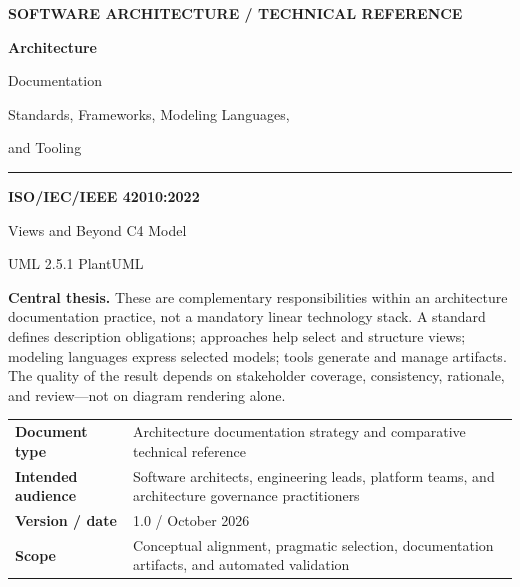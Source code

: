 \documentclass[11pt,letterpaper,oneside]{article}
\begin{document}
\thispagestyle{empty}
\vspace*{0.42in}
\vspace{0.32in}
{\small\bfseries\color{Teal}\MakeUppercase{Software Architecture / Technical Reference}}\par
\vspace{0.24in}
{\fontsize{31}{36}\selectfont\bfseries\color{Navy} Architecture\par Documentation}\par
\vspace{0.17in}
{\Large\color{Slate} Standards, Frameworks, Modeling Languages,\par and Tooling}\par
\vspace{0.34in}
\rule{\textwidth}{0.8pt}
\vspace{0.20in}
{\large\bfseries\color{Navy}ISO/IEC/IEEE 42010:2022\par
Views and Beyond \quad\textbullet\quad C4 Model\par
UML 2.5.1 \quad\textbullet\quad PlantUML}\par
\vspace{0.38in}
\begin{keybox}
\textbf{Central thesis.} These are complementary responsibilities within an architecture documentation practice, not a mandatory linear technology stack. A standard defines description obligations; approaches help select and structure views; modeling languages express selected models; tools generate and manage artifacts. The quality of the result depends on stakeholder coverage, consistency, rationale, and review---not on diagram rendering alone.
\end{keybox}
\vfill
\begin{tabularx}{\textwidth}{@{}L{0.30\textwidth}Y@{}}
\textbf{Document type} & Architecture documentation strategy and comparative technical reference\\
\textbf{Intended audience} & Software architects, engineering leads, platform teams, and architecture governance practitioners\\
\textbf{Version / date} & 1.0 \quad/ October 2026\\
\textbf{Scope} & Conceptual alignment, pragmatic selection, documentation artifacts, and automated validation\\
\end{tabularx}
\vspace{0.10in}
\clearpage
\end{document}
